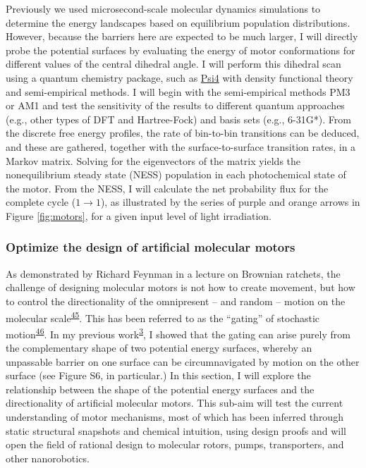 \documentclass[11pt,notitlepage]{article}
\begin{document}
Previously we used microsecond-scale molecular dynamics simulations to
determine the energy landscapes based on equilibrium population
distributions. However, because the barriers here are expected to be
much larger, I will directly probe the potential surfaces by evaluating
the energy of motor conformations for different values of the central
dihedral angle. I will perform this dihedral scan using a quantum
chemistry package, such as \href{http://psicode.org/}{Psi4} with density
functional theory and semi-empirical methods. I will begin with the
semi-empirical methods PM3 or AM1 and test the sensitivity of the
results to different quantum approaches (e.g., other types of DFT and
Hartree-Fock) and basis sets (e.g., 6-31G*). From the discrete free
energy profiles, the rate of bin-to-bin transitions can be deduced, and
these are gathered, together with the surface-to-surface transition
rates, in a Markov matrix. Solving for the eigenvectors of the matrix
yields the nonequilibrium steady state (NESS) population in each
photochemical state of the motor. From the NESS, I will calculate the
net probability flux for the complete cycle (\(1 \rightarrow 1\)), as
illustrated by the series of purple and orange arrows in Figure
\ref{fig:motors}, for a given input level of light irradiation.

\hypertarget{optimize-the-design-of-artificial-molecular-motors-1}{%
\subsubsection{Optimize the design of artificial molecular
motors}\label{optimize-the-design-of-artificial-molecular-motors-1}}

As demonstrated by Richard Feynman in a lecture on Brownian ratchets,
the challenge of designing molecular motors is not how to create
movement, but how to control the directionality of the omnipresent --
and random -- motion on the molecular
scale\textsuperscript{\protect\hyperlink{ref-10FsKpWBI}{45}}. This has
been referred to as the ``gating'' of stochastic
motion\textsuperscript{\protect\hyperlink{ref-qhUBHBOM}{46}}. In my
previous work\textsuperscript{\protect\hyperlink{ref-1BfYw0gk2}{3}}, I
showed that the gating can arise purely from the complementary shape of
two potential energy surfaces, whereby an unpassable barrier on one
surface can be circumnavigated by motion on the other surface (see
Figure S6, in particular.) In this section, I will explore the
relationship between the shape of the potential energy surfaces and the
directionality of artificial molecular motors. This sub-aim will test
the current understanding of motor mechanisms, most of which has been
inferred through static structural snapshots and chemical intuition,
using design proofs and will open the field of rational design to
molecular rotors, pumps, transporters, and other nanorobotics.
\end{document}
